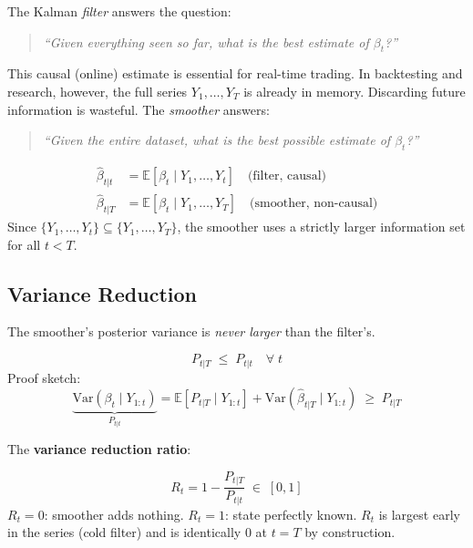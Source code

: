 \documentclass[10pt,a4paper,twocolumn]{article}
\begin{document}
The Kalman \emph{filter} answers the question:
\begin{quote}\itshape
  ``Given everything seen so far, what is the best estimate of $\beta_t$?''
\end{quote}
This causal (online) estimate is essential for real-time trading.
In backtesting and research, however, the full series
$Y_1,\ldots,Y_T$ is already in memory.  Discarding future information
is wasteful.  The \emph{smoother} answers:
\begin{quote}\itshape
  ``Given the entire dataset, what is the best possible estimate of $\beta_t$?''
\end{quote}

\begin{tcolorbox}[notebox={Filter vs.\ Smoother: Information Set}]
\begin{align*}
  \hat{\beta}_{t|t}
    &= \mathbb{E}[\beta_t \mid Y_1,\ldots,Y_t]
    \quad\text{(filter, causal)}\\
  \hat{\beta}_{t|T}
    &= \mathbb{E}[\beta_t \mid Y_1,\ldots,Y_T]
    \quad\text{(smoother, non-causal)}
\end{align*}
Since $\{Y_1,\ldots,Y_t\} \subseteq \{Y_1,\ldots,Y_T\}$, the smoother
uses a strictly larger information set for all $t < T$.
\end{tcolorbox}

\subsection{Variance Reduction}

The smoother's posterior variance is \emph{never larger} than the filter's.

\begin{tcolorbox}[mathbox={Variance Ordering (Law of Total Variance)}]
\vspace{-4pt}
\begin{equation}\label{eq:var_order}
  P_{t|T} \;\leq\; P_{t|t} \quad \forall\; t
\end{equation}
\vspace{-4pt}
Proof sketch:
\[
  \underbrace{\mathrm{Var}(\beta_t \mid Y_{1:t})}_{P_{t|t}}
  = \mathbb{E}[P_{t|T} \mid Y_{1:t}]
  + \mathrm{Var}(\hat\beta_{t|T} \mid Y_{1:t})
  \;\geq\; P_{t|T}
\]
\end{tcolorbox}

The \textbf{variance reduction ratio}:

\begin{tcolorbox}[mathbox={Variance Reduction Ratio}]
\vspace{-3pt}
\begin{equation}\label{eq:vr}
  R_t = 1 - \frac{P_{t|T}}{P_{t|t}} \;\in\; [0, 1]
\end{equation}
\vspace{-4pt}
$R_t = 0$: smoother adds nothing. $R_t = 1$: state perfectly known.
$R_t$ is largest early in the series (cold filter) and is identically
$0$ at $t = T$ by construction.
\end{tcolorbox}
\end{document}
